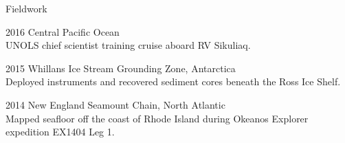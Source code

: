 \begin{cvlist}{Fieldwork} 

\item[2016] Central Pacific Ocean \\
UNOLS chief scientist training cruise aboard RV Sikuliaq. \\

\item[2015] Whillans Ice Stream Grounding Zone, Antarctica \\
Deployed instruments and recovered sediment cores beneath the Ross Ice Shelf. \\

\item[2014] New England Seamount Chain, North Atlantic \\
Mapped seafloor off the coast of Rhode Island during Okeanos Explorer expedition EX1404 Leg 1. \\

\end{cvlist}
